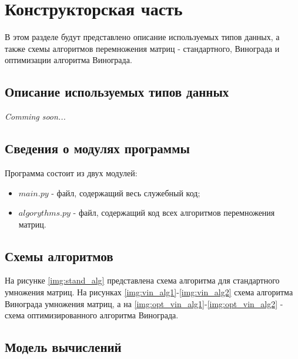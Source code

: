 \chapter{Конструкторская часть}
В этом разделе будут представлено описание используемых типов данных, а также схемы алгоритмов перемножения матриц - стандартного, Винограда и оптимизации алгоритма Винограда.

\section{Описание используемых типов данных}

\textit{Comming soon...}


\section{Сведения о модулях программы}
Программа состоит из двух модулей:
\begin{itemize}
	\item $main.py$ - файл, содержащий весь служебный код;
    \item $algorythms.py$ - файл, содержащий код всех алгоритмов перемножения матриц. \newline
\end{itemize}


\section{Схемы алгоритмов}
На рисунке \ref{img:stand_alg} представлена схема алгоритма для стандартного умножения матриц. На рисунках \ref{img:vin_alg1}-\ref{img:vin_alg2} схема алгоритма Винограда умножения матриц, а на \ref{img:opt_vin_alg1}-\ref{img:opt_vin_alg2} - схема оптимизированного алгоритма Винограда. 


\clearpage


\section{Модель вычислений}

